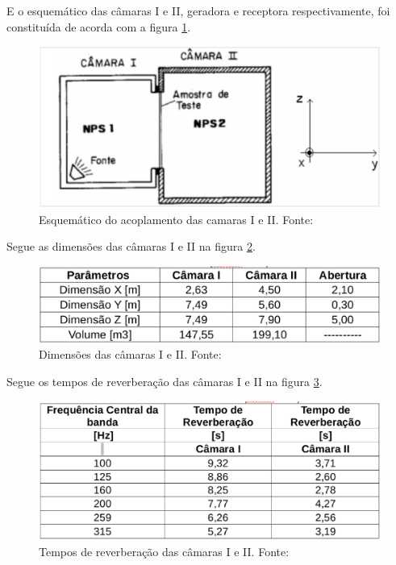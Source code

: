 E o esquemático das câmaras I e II, geradora e receptora respectivamente, foi constituída de acorda com a figura \ref{experimento_1}.

\begin{figure}[h]
	\centering
	\includegraphics[scale=0.28]{imagem_3.eps}
	\caption{Esquemático do acoplamento das camaras I e II. Fonte: \cite{silva2009simulaccao}}
	\label{experimento_1}
\end{figure}

\newpage
Segue as dimensões das câmaras I e II na figura \ref{experimento_2}.

\begin{figure}[h]
	\centering
	\includegraphics[scale=0.35]{imagem_4.eps}
	\caption{Dimensões das câmaras I e II. Fonte: \cite{silva2009simulaccao}}
	\label{experimento_2}
\end{figure}

Segue os tempos de reverberação das câmaras I e II na figura \ref{experimento_3}.
\begin{figure}[h]
	\centering
	\includegraphics[scale=0.35]{imagem_5.eps}
	\caption{Tempos de reverberação das câmaras I e II. Fonte: \cite{silva2009simulaccao}}
	\label{experimento_3}
\end{figure}

